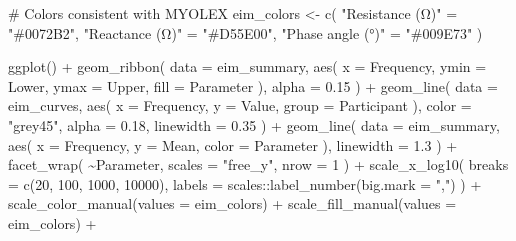 \documentclass[
  letterpaper,
  DIV=11,
  numbers=noendperiod]{scrreprt}
\newenvironment{Shaded}{\begin{snugshade}}{\end{snugshade}}
\newcommand{\AttributeTok}[1]{\textcolor[rgb]{0.40,0.45,0.13}{#1}}
\newcommand{\CommentTok}[1]{\textcolor[rgb]{0.37,0.37,0.37}{#1}}
\newcommand{\DecValTok}[1]{\textcolor[rgb]{0.68,0.00,0.00}{#1}}
\newcommand{\FloatTok}[1]{\textcolor[rgb]{0.68,0.00,0.00}{#1}}
\newcommand{\FunctionTok}[1]{\textcolor[rgb]{0.28,0.35,0.67}{#1}}
\newcommand{\NormalTok}[1]{\textcolor[rgb]{0.00,0.23,0.31}{#1}}
\newcommand{\OtherTok}[1]{\textcolor[rgb]{0.00,0.23,0.31}{#1}}
\newcommand{\SpecialCharTok}[1]{\textcolor[rgb]{0.37,0.37,0.37}{#1}}
\newcommand{\StringTok}[1]{\textcolor[rgb]{0.13,0.47,0.30}{#1}}
\begin{document}
\begin{Shaded}
\begin{Highlighting}[]
\CommentTok{\# Colors consistent with MYOLEX}
\NormalTok{eim\_colors }\OtherTok{\textless{}{-}} \FunctionTok{c}\NormalTok{(}
  \StringTok{"Resistance (Ω)"} \OtherTok{=} \StringTok{"\#0072B2"}\NormalTok{,}
  \StringTok{"Reactance (Ω)"} \OtherTok{=} \StringTok{"\#D55E00"}\NormalTok{,}
  \StringTok{"Phase angle (°)"} \OtherTok{=} \StringTok{"\#009E73"}
\NormalTok{)}

\FunctionTok{ggplot}\NormalTok{() }\SpecialCharTok{+}
  \FunctionTok{geom\_ribbon}\NormalTok{(}
    \AttributeTok{data =}\NormalTok{ eim\_summary,}
    \FunctionTok{aes}\NormalTok{(}
      \AttributeTok{x =}\NormalTok{ Frequency,}
      \AttributeTok{ymin =}\NormalTok{ Lower,}
      \AttributeTok{ymax =}\NormalTok{ Upper,}
      \AttributeTok{fill =}\NormalTok{ Parameter}
\NormalTok{    ),}
    \AttributeTok{alpha =} \FloatTok{0.15}
\NormalTok{  ) }\SpecialCharTok{+}
  \FunctionTok{geom\_line}\NormalTok{(}
    \AttributeTok{data =}\NormalTok{ eim\_curves,}
    \FunctionTok{aes}\NormalTok{(}
      \AttributeTok{x =}\NormalTok{ Frequency,}
      \AttributeTok{y =}\NormalTok{ Value,}
      \AttributeTok{group =}\NormalTok{ Participant}
\NormalTok{    ),}
    \AttributeTok{color =} \StringTok{"grey45"}\NormalTok{,}
    \AttributeTok{alpha =} \FloatTok{0.18}\NormalTok{,}
    \AttributeTok{linewidth =} \FloatTok{0.35}
\NormalTok{  ) }\SpecialCharTok{+}
  \FunctionTok{geom\_line}\NormalTok{(}
    \AttributeTok{data =}\NormalTok{ eim\_summary,}
    \FunctionTok{aes}\NormalTok{(}
      \AttributeTok{x =}\NormalTok{ Frequency,}
      \AttributeTok{y =}\NormalTok{ Mean,}
      \AttributeTok{color =}\NormalTok{ Parameter}
\NormalTok{    ),}
    \AttributeTok{linewidth =} \FloatTok{1.3}
\NormalTok{  ) }\SpecialCharTok{+}
  \FunctionTok{facet\_wrap}\NormalTok{(}
    \SpecialCharTok{\textasciitilde{}}\NormalTok{Parameter,}
    \AttributeTok{scales =} \StringTok{"free\_y"}\NormalTok{,}
    \AttributeTok{nrow =} \DecValTok{1}
\NormalTok{  ) }\SpecialCharTok{+}
  \FunctionTok{scale\_x\_log10}\NormalTok{(}
    \AttributeTok{breaks =} \FunctionTok{c}\NormalTok{(}\DecValTok{20}\NormalTok{, }\DecValTok{100}\NormalTok{, }\DecValTok{1000}\NormalTok{, }\DecValTok{10000}\NormalTok{),}
    \AttributeTok{labels =}\NormalTok{ scales}\SpecialCharTok{::}\FunctionTok{label\_number}\NormalTok{(}\AttributeTok{big.mark =} \StringTok{","}\NormalTok{)}
\NormalTok{  ) }\SpecialCharTok{+}
  \FunctionTok{scale\_color\_manual}\NormalTok{(}\AttributeTok{values =}\NormalTok{ eim\_colors) }\SpecialCharTok{+}
  \FunctionTok{scale\_fill\_manual}\NormalTok{(}\AttributeTok{values =}\NormalTok{ eim\_colors) }\SpecialCharTok{+}

\end{Highlighting}
\end{Shaded}
\end{document}
